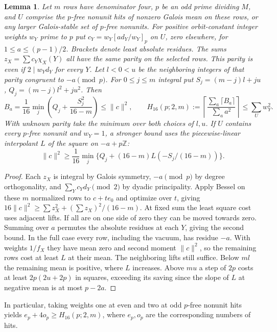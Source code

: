 \documentclass[11pt]{amsart}
\numberwithin{equation}{section}
\newtheorem{lemma}[theorem]{Lemma}
\theoremstyle{definition}
\theoremstyle{plain}
\newcommand{\ZZ}{\mathbb Z}
\begin{document}
\begin{lemma}\label{result:joint-projection}
Let $m$ rows have denominator four, $p$ be an odd prime dividing $M$,
and $U$ comprise the $p$-free nonunit hits of nonzero Galois mean
on these rows, or any larger Galois-stable set of $p$-free nonunits.
For positive orbit-constant integer weights $w_Y$ prime to $p$ put
$c_Y=w_Y[ad_Y/w_Y]_p$ on $U$, zero elsewhere, for $1\le a\le(p-1)/2$.
Brackets denote least absolute residues. The sums
$z_X=\sum c_Y\chi_X(Y)$ all have the same parity on the selected
rows. This parity is even if $2\mid w_Yd_Y$ for every $Y$. Let $l<0<u$ be the
neighboring integers of that parity congruent to $-a\pmod p$.
For $0\le j\le m$ integral put $S_j=(m-j)l+ju$,
$Q_j=(m-j)l^2+ju^2$. Then
\[
 B_a=\frac1{16}\min_j\left(Q_j+\frac{S_j^2}{16-m}\right)
 \le\|c\|^2,
 \qquad
 H_{16}(p;2,m):=
 \left\lceil\frac{\sum_a\lceil B_a\rceil}{\sum_a a^2}\right\rceil
 \le\sum_U w_Y^2 .
\]
With unknown parity take the minimum over both choices of $l,u$.
If $U$ contains every $p$-free nonunit and $w_Y=1$, a stronger
bound uses the piecewise-linear interpolant $L$ of the square on
$-a+p\ZZ$:
\begin{equation}\label{eq:full-census}
 \|c\|^2\ge\frac1{16}\min_j
       \{Q_j+(16-m)L(-S_j/(16-m))\}.
\end{equation}
\end{lemma}
\begin{proof}
Each $z_X$ is integral by Galois symmetry, $-a\pmod p$ by degree
orthogonality, and $\sum_Y c_Yd_Y\pmod2$ by dyadic principality.
Apply Bessel on these $m$ normalized rows to $c+te_0$ and optimize
over $t$, giving $16\|c\|^2\ge\sum z_X^2+(\sum z_X)^2/(16-m)$.
At fixed sum the least square cost uses adjacent lifts. If all
are on one side of zero they can be moved towards zero. Summing
over $a$ permutes the absolute residues at each $Y$, giving the
second bound. In the full case every row, including the vacuum,
has residue $-a$. With weights $1/f_X$ they have mean zero and
second moment $\|c\|^2$, so the remaining rows cost at least $L$ at
their mean. The neighboring lifts still suffice. Below $ml$ the
remaining mean is positive, where $L$ increases. Above $mu$ a
step of $2p$ costs at least $2p(2u+2p)$ in squares, exceeding
its saving since the slope of $L$ at negative mean is at most $p-2a$.
\end{proof}
In particular, taking weights one at even and two at odd $p$-free
nonunit hits yields $e_p+4o_p\ge H_{16}(p;2,m)$, where $e_p,o_p$
are the corresponding numbers of hits.
\end{document}
